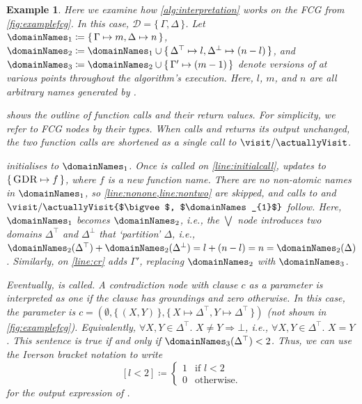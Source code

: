 \documentclass{article}
\newtheorem{example}{Example}
\newcommand{\Done}{\domainNames_{1}}
\newcommand{\Dtwo}{\domainNames_{2}}
\newcommand{\Dthree}{\domainNames_{3}}
\DeclareMathOperator{\CR}{\textsc{CR}}
\DeclareMathOperator{\GDR}{\textsc{GDR}}
\begin{document}
\begin{example}\label{example:interpretation}
  Here we examine how \cref{alg:interpretation} works on the FCG from
  \cref{fig:examplefcg}. In this case, $\mathcal{D} = \{\, \Gamma, \Delta \,\}$.
  Let $\Done \coloneqq \{\, \Gamma \mapsto m, \Delta \mapsto n \,\}$,
  $\Dtwo \coloneqq \Done \cup \{\, \Delta^{\top} \mapsto l, \Delta^{\bot} \mapsto (n-l) \,\}$,
  and $\Dthree \coloneqq \Dtwo \cup \{\, \Gamma' \mapsto (m-1) \,\}$ denote
  versions of \domainNames at various points throughout the algorithm's
  execution. Here, $l$, $m$, and $n$ are all arbitrary names generated by
  \newDomainName.

   shows the outline of function calls and their return
  values. For simplicity, we refer to FCG nodes by their types. When \visit
  calls \actuallyVisit and returns its output unchanged, the two function calls
  are shortened as a single call to $\visit/\actuallyVisit$.

   initialises \domainNames to $\Done$. Once \visit{$\GDR$,
    $\Done$} is called on \cref{line:initialcall}, \newFunctionName updates
  \functionNames to $\{\, \GDR \mapsto f \,\}$, where $f$ is a new function
  name. There are no non-atomic names in $\Done$, so
  \cref{line:nonone,line:nontwo} are skipped, and calls to
  \actuallyVisit{$\GDR$, $\Done$} and
  $\visit/\actuallyVisit{$\bigvee$, $\Done$}$ follow. Here, $\Done$ becomes
  $\Dtwo$, i.e., the $\bigvee$ node introduces two domains $\Delta^{\top}$ and
  $\Delta^{\bot}$ that `partition' $\Delta$, i.e.,
  $\Dtwo(\Delta^{\top}) + \Dtwo(\Delta^{\bot}) = l + (n-l) = n = \Dtwo(\Delta)$.
  Similarly, \actuallyVisit{$\CR$, $\Dtwo$} on \cref{line:cr} adds $\Gamma'$,
  replacing $\Dtwo$ with $\Dthree$.

  Eventually, \actuallyVisit{$\bot$, $\Dthree$} is called. A contradiction node
  with clause $c$ as a parameter is interpreted as one if the clause has
  groundings and zero otherwise. In this case, the parameter is
  $c = (\emptyset, \{\, (X, Y) \,\}, \{\, X \mapsto \Delta^\top, Y \mapsto \Delta^\top \,\})$
  (not shown in \cref{fig:examplefcg}). Equivalently,
  $\forall X, Y \in \Delta^{\top}\text{. }X \ne Y \Rightarrow \bot$, i.e.,
  $\forall X, Y \in \Delta^{\top}\text{. }X = Y$. This sentence is true if and
  only if $\Dthree(\Delta^{\top}) < 2$. Thus, we can use the Iverson bracket
  notation to write
  \[
    [l < 2] \coloneqq
    \begin{cases}
      1 & \text{if } l < 2 \\
      0 & \text{otherwise.}
    \end{cases}
  \]
  for the output expression of \actuallyVisit{$\bot$, $\Dthree$}.


\end{example}
\end{document}
